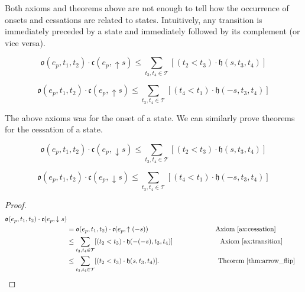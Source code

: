 Both axioms and theorems above are not enough to tell how the occurrence of onsets and cessations are related to states.
Intuitively, any
transition is immediately preceded by a state and immediately followed by its complement (or vice versa).

\begin{axiom}\label{ax:transition}
    \begin{equation}
        \mathfrak{o}(e_p, t_1, t_2) \cdot \mathfrak{c}(e_p, \uparrow s) \leq \sum_{t_3, t_4 \in \mathcal{T}}[(t_2 < t_3) \cdot \mathfrak{h}(s, t_3, t_4)]
    \end{equation}
\end{axiom}
\begin{axiom}
    \begin{equation}
        \mathfrak{o}(e_p, t_1, t_2) \cdot \mathfrak{c}(e_p, \uparrow s) \leq \sum_{t_3, t_4 \in \mathcal{T}} [(t_4 < t_1) \cdot \mathfrak{h}(-s, t_3, t_4)]
    \end{equation}
\end{axiom}

The above axioms was for the onset of a state. We can similarly prove theorems for the cessation of a state.

\begin{theorem}\label{thm:cessation}
    \begin{equation}
        \mathfrak{o}(e_p, t_1, t_2) \cdot \mathfrak{c}(e_p, \downarrow s) \leq \sum_{t_3, t_4 \in \mathcal{T}}[(t_2 < t_3) \cdot \mathfrak{h}(s, t_3, t_4)]
    \end{equation}
\end{theorem}
\begin{theorem}\label{thm:cessation_2}
    \begin{equation}
        \mathfrak{o}(e_p, t_1, t_2) \cdot \mathfrak{c}(e_p, \downarrow s) \leq \sum_{t_3, t_4 \in \mathcal{T}} [(t_4 < t_1) \cdot \mathfrak{h}(-s, t_3, t_4)]
    \end{equation}
\end{theorem}

\begin{proof}
    \begin{align*}
        \mathfrak{o}(e_p, t_1, t_2) \cdot \mathfrak{c}(e_p, \downarrow s)                                                                                     \\
         & = \mathfrak{o}(e_p, t_1, t_2) \cdot \mathfrak{c}(e_p, \uparrow (-s))  \hspace{0.29\linewidth  }  \text{Axiom~\ref{ax:cessation}}                   \\
         & \leq \sum_{t_3, t_4 \in \mathcal{T}}[(t_2 < t_3) \cdot \mathfrak{h}(-(-s), t_3, t_4)] \hspace{0.204 \linewidth}   \text{Axiom~\ref{ax:transition}} \\
         & \leq \sum_{t_3, t_4 \in \mathcal{T}}[(t_2 < t_3) \cdot \mathfrak{h}(s, t_3, t_4)]. \hspace{0.255 \linewidth}   \text{Theorem~\ref{thm:arrow_flip}}
    \end{align*}
\end{proof}

